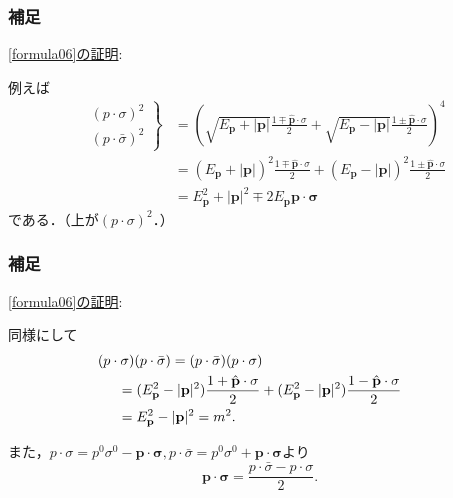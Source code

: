 \documentclass[pdflatex,unicode,ja=standard,12pt]{beamer}
\begin{document}
\begin{frame}[noframenumbering]

  \frametitle{補足 \subsecname}
  \thispagestyle{empty}

  \uline{\eqref{formula06}の証明}:

  \vspace{10pt}

  例えば
  \begin{align}
    \left.
      \begin{alignedat}{1}
        &(p\cdot\sigma)^2
        \\
        &(p\cdot\bar{\sigma})^2
      \end{alignedat}
    \right\}
    &=
    \left(  
      \sqrt{E_{\mathbf{p}}+|\mathbf{p}|}
      \frac{1\mp\hat{\mathbf{p}}\cdot\sigma}{2}
      +
      \sqrt{E_{\mathbf{p}}-|\mathbf{p}|}
      \frac{1\pm\hat{\mathbf{p}}\cdot\sigma}{2}
    \right)^4
    \nonumber
    \\
    &=
    (E_{\mathbf{p}}+|\mathbf{p}|)^2
    \frac{1\mp\hat{\mathbf{p}}\cdot\sigma}{2}
    +
    (E_{\mathbf{p}}-|\mathbf{p}|)^2
    \frac{1\pm\hat{\mathbf{p}}\cdot\sigma}{2}
    \nonumber
    \\
    &=
    E_{\mathbf{p}}^2+|\mathbf{p}|^2\mp 2E_{\mathbf{p}}\mathbf{p}\cdot\bm{\sigma}
  \end{align}
  である．（上が$(p\cdot\sigma)^2$．）

\end{frame}

\begin{frame}[noframenumbering]

  \frametitle{補足 \subsecname}
  \thispagestyle{empty}

  \uline{\eqref{formula06}の証明}:

  \vspace{10pt}

  同様にして
  \begin{align}
    &\hspace{-0.5cm}
    (p\cdot\sigma)
    (p\cdot\bar{\sigma})  
    =    
    (p\cdot\bar{\sigma}) 
    (p\cdot\sigma)
    \nonumber
    \\
    &=
    (E_{\mathbf{p}}^2-|\mathbf{p}|^2)
    \frac{1+\hat{\mathbf{p}}\cdot\sigma}{2}
    +    
    (E_{\mathbf{p}}^2-|\mathbf{p}|^2)
    \frac{1-\hat{\mathbf{p}}\cdot\sigma}{2}
    \nonumber
    \\
    &=
    E_{\mathbf{p}}^2-|\mathbf{p}|^2
    =
    m^2
    .
  \end{align}

  また，$p\cdot\sigma=p^{0}\sigma^{0}-\mathbf{p}\cdot\bm{\sigma},p\cdot\bar{\sigma}=p^{0}\sigma^{0}+\mathbf{p}\cdot\bm{\sigma}$より
  \begin{equation}    
    \mathbf{p}\cdot\bm{\sigma}
    =
    \frac{p\cdot\bar{\sigma}-p\cdot\sigma}{2}
    .
  \end{equation}

\end{frame}
\end{document}
